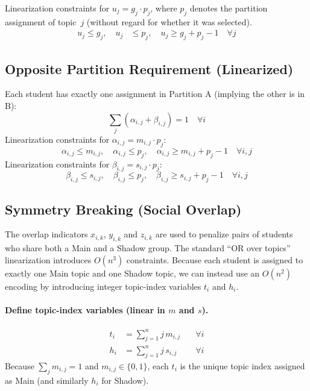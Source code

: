 \documentclass[12pt]{article}
\begin{document}
	Linearization constraints for $u_j = g_j \cdot p_j$, where $p_j$ denotes the partition assignment of topic~$j$ (without regard for whether it was selected).
	\begin{align}
		u_j \le g_j, \quad u_j &\le p_j, \quad u_j \ge g_j + p_j - 1 \quad  \forall j
	\end{align}
	
	\subsection{Opposite Partition Requirement (Linearized)}
	Each student has exactly one assignment in Partition A (implying the other is in B):
	\begin{equation}
		\sum_j (\alpha_{i,j} + \beta_{i,j}) = 1 \quad \forall i
	\end{equation}
	Linearization constraints for $\alpha_{i,j} = m_{i,j} \cdot p_j$:
	\begin{equation}
		\alpha_{i,j} \le m_{i,j}, \quad \alpha_{i,j} \le p_j, \quad \alpha_{i,j} \ge m_{i,j} + p_j - 1 \quad \forall i, j
	\end{equation}
	Linearization constraints for $\beta_{i,j} = s_{i,j} \cdot p_j$:
	\begin{equation}
		\beta_{i,j} \le s_{i,j}, \quad \beta_{i,j} \le p_j, \quad \beta_{i,j} \ge s_{i,j} + p_j - 1 \quad \forall i, j
	\end{equation}
	
	\subsection{Symmetry Breaking (Social Overlap)}
The overlap indicators $x_{i,k}$, $y_{i,k}$ and $z_{i,k}$ are used to penalize pairs of students who share both a Main and a Shadow group. The standard ``OR over topics'' linearization introduces $O(n^3)$ constraints. Because each student is assigned to exactly one Main topic and one Shadow topic, we can instead use an $O(n^2)$ encoding by introducing integer topic-index variables $t_i$ and $h_i$.

\paragraph{Define topic-index variables (linear in $m$ and $s$).}
\begin{align}
t_i &= \sum_{j=1}^n j\, m_{i,j} \quad &\forall i\\
h_i &= \sum_{j=1}^n j\, s_{i,j} \quad &\forall i
\end{align}
Because $\sum_j m_{i,j}=1$ and $m_{i,j}\in\{0,1\}$, each $t_i$ is the unique topic index assigned as Main (and similarly $h_i$ for Shadow).
\end{document}
